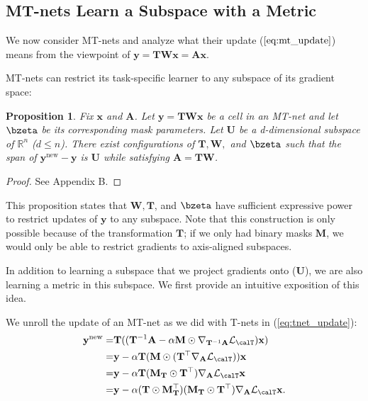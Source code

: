 \documentclass{article}
\newtheorem{prop}{Proposition}
\newcommand{\x}{\mathbf{x}}
\newcommand{\y}{\mathbf{y}}
\newcommand{\A}{\mathbf{A}}
\newcommand{\W}{\mathbf{W}}
\newcommand{\T}{\mathbf{T}}
\newcommand{\M}{\mathbf{M}}
\newcommand{\logit}{\bzeta}
\newcommand{\loss}{\mathcal{L}_{\calT}}
\newcommand{\U}{\mathbf{U}}
\newcommand{\mask}{\M}
\newcommand{\maskT}{\mask_{\T}}
\newcommand{\Rn}{\mathbb{R}^n}
\begin{document}



\subsection{MT-nets Learn a Subspace with a Metric}
\label{subsec:mtnet_analysis}
We now consider MT-nets and analyze what their update ($\ref{eq:mt_update}$) means from the viewpoint of $\y = \T \W \x = \A \x$.

MT-nets can restrict its task-specific learner to any subspace of its gradient space:

\begin{prop}
\label{prop}
Fix $\x$ and $\A$. 
Let $\y = \T \W \x$ be a cell in an MT-net and let $\logit$ be its corresponding mask parameters.
Let $\U$ be a d-dimensional subspace of $\Rn$ ($d \leq n$).
There exist configurations of $\T, \W,$ and $\logit$ such that the span of $\y^\text{new}-\y$ is $\U$ while satisfying $\A = \T \W$.
\end{prop}

\begin{proof}
See Appendix B.
\end{proof}

This proposition states that $\W, \T$, and $\logit$ have sufficient expressive power to restrict updates of $\y$ to any subspace.
Note that this construction is only possible because of the transformation $\T$; if we only had binary masks $\mask$, we would only be able to restrict gradients to axis-aligned subspaces.

In addition to learning a subspace that we project gradients onto ($\U$), we are also learning a metric in this subspace.
We first provide an intuitive exposition of this idea.

We unroll the update of an MT-net as we did with T-nets in (\ref{eq:tnet_update}):
\begin{align}
\y^\text{new} =& \T ((\T^{-1} \A - \alpha \mask \odot \nabla_{\T^{-1} \A} \loss) \x) \nonumber \\
=& \y - \alpha \T (\mask \odot (\T^{\top} \nabla_{\A} \loss)) \x \nonumber \\
=& \y - \alpha \T (\maskT \odot \T^{\top}) \nabla_{\A} \loss \x \nonumber \\
=& \y - \alpha (\T \odot \maskT^{\top}) (\maskT \odot \T^{\top}) \nabla_{\A} \loss \x.
\label{sumnet_metric}
\end{align}
\end{document}
